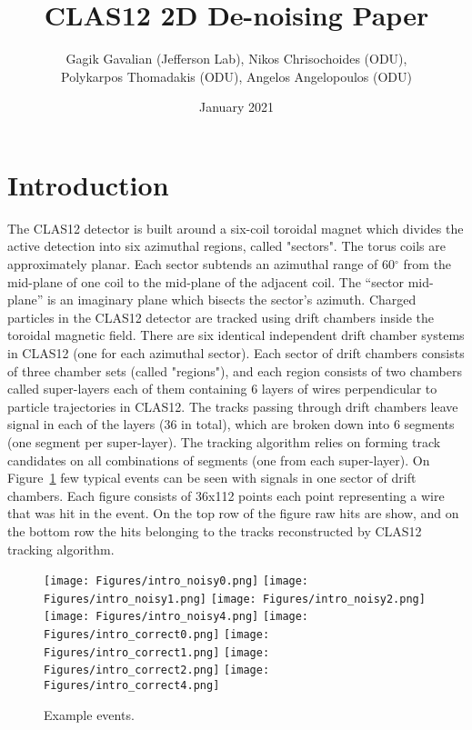 \documentclass{article}
\title{CLAS12 2D De-noising Paper}
\author{Gagik Gavalian (Jefferson Lab), Nikos Chrisochoides (ODU), \\
Polykarpos Thomadakis (ODU), Angelos Angelopoulos (ODU)}
\date{January 2021}
\begin{document}
\maketitle

\section{Introduction}

\indent

The CLAS12 \cite{Burkert:2020akg} detector is built around a six-coil toroidal magnet which divides the active detection into six azimuthal regions, called "sectors". The torus coils are approximately planar. Each sector subtends an azimuthal range of 60$^\circ$ from the mid-plane of one coil to the mid-plane of the adjacent coil. The “sector mid-plane” is an imaginary plane which bisects the sector’s azimuth.
Charged particles in the CLAS12 detector are tracked using drift chambers \cite{Mestayer:2020saf} inside the toroidal magnetic field. There are six identical independent drift chamber systems in CLAS12 (one for each azimuthal sector). Each sector of drift chambers consists of three chamber sets (called "regions"), and each region consists of two chambers called super-layers each of them containing 6 layers of wires perpendicular to particle trajectories in CLAS12. The tracks passing through drift chambers leave signal in each of the layers (36 in total), which are broken down into 6 segments (one segment per super-layer). The tracking algorithm relies on forming track candidates on all combinations of segments (one from each super-layer). On Figure~\ref{dc:tracks} few typical events can be seen with signals in one sector of drift chambers.
Each figure consists of 36x112 points each point representing a wire that was hit in the event. On the top row of the figure raw hits are show, and on the bottom row the hits belonging to the tracks reconstructed by CLAS12 tracking algorithm.

\begin{figure}[!ht]
\begin{center}
 \texttt{[image: Figures/intro\_noisy0.png]}
  \texttt{[image: Figures/intro\_noisy1.png]}
   \texttt{[image: Figures/intro\_noisy2.png]}
    \texttt{[image: Figures/intro\_noisy4.png]}
   \texttt{[image: Figures/intro\_correct0.png]}
     \texttt{[image: Figures/intro\_correct1.png]}
        \texttt{[image: Figures/intro\_correct2.png]}
           \texttt{[image: Figures/intro\_correct4.png]}
\caption {Example events.}
 \label{dc:tracks}
 \end{center}
\end{figure}
\end{document}
